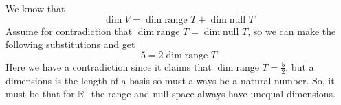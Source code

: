 \documentclass[10pt, twocolumn]{article}
\newcommand{\R}{\mathbb{R}}
\newcommand{\nul}{\text{null }}
\newcommand{\range}{\text{range }}
\begin{document}
\begin{q}[6]
	We know that $$ \dim V = \dim \range	T + \dim \nul T $$
	Assume for contradiction that $ \dim \range	T = \dim \nul T $, 
	so we can make the following substitutions and get 
	$$ 5 = 2 \dim \range T $$
	Here we have a contradiction since it claims that $ \dim \range T = \frac{5}{2} $, 
	but a dimensions is the length of a basis so must always be a natural number. 
	So, it must be that for $ \R^5 $ the range and null space always have unequal dimensions.
\end{q}
\end{document}
